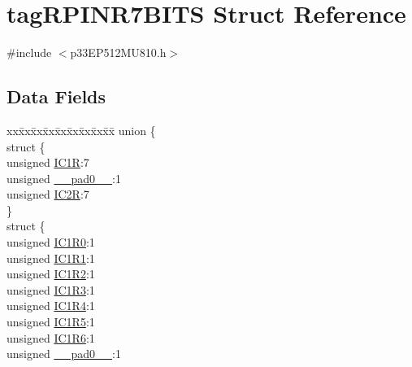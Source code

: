 \hypertarget{structtag_r_p_i_n_r7_b_i_t_s}{}\section{tag\+R\+P\+I\+N\+R7\+B\+I\+TS Struct Reference}
\label{structtag_r_p_i_n_r7_b_i_t_s}


{\ttfamily \#include $<$p33\+E\+P512\+M\+U810.\+h$>$}

\subsection*{Data Fields}
\begin{DoxyCompactItemize}
\item 
\begin{tabbing}
xx\=xx\=xx\=xx\=xx\=xx\=xx\=xx\=xx\=\kill
union \{\\
\>struct \{\\
\>\>unsigned \hyperlink{structtag_r_p_i_n_r7_b_i_t_s_a57812d24ffadabde6acd5e28bfc53d05}{IC1R}:7\\
\>\>unsigned \hyperlink{structtag_r_p_i_n_r7_b_i_t_s_adf71f3d8410c1f1dbbc96680a92c49af}{\_\_pad0\_\_}:1\\
\>\>unsigned \hyperlink{structtag_r_p_i_n_r7_b_i_t_s_a7c2333ed59718495fc74d5a9268757ec}{IC2R}:7\\
\>\} \\
\>struct \{\\
\>\>unsigned \hyperlink{structtag_r_p_i_n_r7_b_i_t_s_a8c5602fb8042e6fcbd8d50a7831412a9}{IC1R0}:1\\
\>\>unsigned \hyperlink{structtag_r_p_i_n_r7_b_i_t_s_af51239e3650aaeaf6ac8827f766bfd56}{IC1R1}:1\\
\>\>unsigned \hyperlink{structtag_r_p_i_n_r7_b_i_t_s_af2ee61e6a90e569d133e9d86302c0cc3}{IC1R2}:1\\
\>\>unsigned \hyperlink{structtag_r_p_i_n_r7_b_i_t_s_a5ea4e5a63915ca81503e8a0f3f8252a0}{IC1R3}:1\\
\>\>unsigned \hyperlink{structtag_r_p_i_n_r7_b_i_t_s_acee7d24b77d45058378df6569cc783f2}{IC1R4}:1\\
\>\>unsigned \hyperlink{structtag_r_p_i_n_r7_b_i_t_s_a3059b8e4f5ca8b80fc0e4fb5de83a6bf}{IC1R5}:1\\
\>\>unsigned \hyperlink{structtag_r_p_i_n_r7_b_i_t_s_abdabc757f22f44790eab86c7e4fe56f6}{IC1R6}:1\\
\>\>unsigned \hyperlink{structtag_r_p_i_n_r7_b_i_t_s_adf71f3d8410c1f1dbbc96680a92c49af}{\_\_pad0\_\_}:1\\

\end{tabbing}
\end{DoxyCompactItemize}
